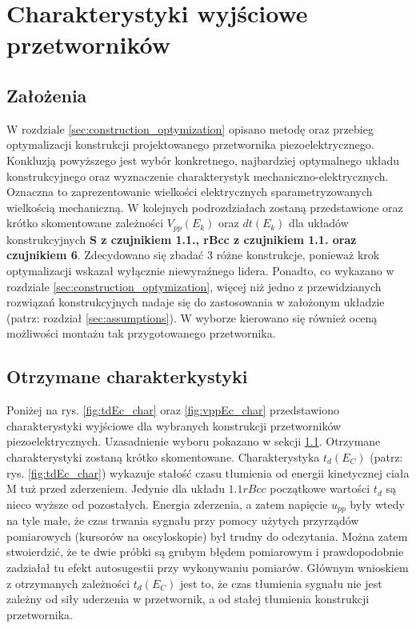 \chapter{Charakterystyki wyjściowe przetworników}
\label{sec:sensor_characteristic}

\section{Założenia}
\label{sec:sensor_characteristic_assumptions}

W rozdziale \ref{sec:construction_optymization} opisano metodę oraz przebieg optymalizacji 
konstrukcji projektowanego przetwornika piezoelektrycznego. Konkluzją powyższego jest wybór
konkretnego, najbardziej optymalnego układu konstrukcyjnego oraz wyznaczenie charakterystyk
mechaniczno-elektrycznych. Oznaczna to zaprezentowanie wielkości elektrycznych 
sparametryzowanych wielkością mechaniczną. W kolejnych podrozdziałach zostaną przedstawione
oraz krótko skomentowane zależności $V_{pp}(E_k)$ oraz $dt(E_k)$ dla układów konstrukcyjnych
\textbf{S z czujnikiem 1.1., rBcc z czujnikiem 1.1. oraz czujnikiem 6}. Zdecydowano się 
zbadać 3 różne konstrukcje, ponieważ krok optymalizacji wskazał wyłącznie niewyraźnego
lidera. Ponadto, co wykazano w rozdziale \ref{sec:construction_optymization}, więcej niż
jedno z przewidzianych rozwiązań konstrukcyjnych nadaje się do zastosowania w założonym
układzie (patrz: rozdział \ref{sec:assumptions}). W wyborze kierowano się również
oceną możliwości montażu tak przygotowanego przetwornika.

\section{Otrzymane charakterkystyki}
\label{sec:sensor_characteristic_td}

\indent Poniżej na rys. \ref{fig:tdEc_char} oraz \ref{fig:vppEc_char} przedstawiono
charakterystyki wyjściowe dla wybranych konstrukcji przetworników piezoelektrycznych.
Uzasadnienie wyboru pokazano w sekcji \ref{sec:sensor_characteristic_assumptions}. 
Otrzymane charakterystyki zostaną krótko skomentowane. Charakterystyka 
$t_d(E_C)$ (patrz: rys. \ref{fig:tdEc_char}) wykazuje stałość czasu tłumienia
od energii kinetycznej ciała M tuż przed zderzeniem. Jedynie dla układu $1.1rBcc$
początkowe wartości $t_d$ są  nieco wyższe od pozostałych. Energia zderzenia, a zatem
napięcie $u_{pp}$ były wtedy na tyle małe, że czas trwania sygnału przy pomocy
użytych przyrządów pomiarowych (kursorów na oscyloskopie) był trudny do odczytania.
Można zatem stwoierdzić, że te dwie próbki są grubym błędem pomiarowym i prawdopodobnie
zadziałał tu efekt autosugestii przy wykonywaniu pomiarów. Głównym wnioskiem z 
otrzymanych zależności $t_d(E_C)$ jest to, że czas tłumienia sygnału nie jest zależny
od siły uderzenia w przetwornik, a od stałej tłumienia konstrukcji przetwornika. 

